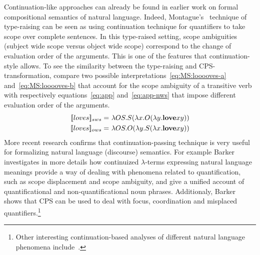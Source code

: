 Continuation-like approaches can already be found in earlier work on formal compositional semantics of natural language. Indeed, Montague's~\cite{Montague:1973:The-Proper-Treatment-of-Quantification-in-Ordinary-English} technique of type-raising can be seen as using continuation technique for quantifiers to take scope over complete sentences. In this type-raised setting, scope ambiguities (subject wide scope versus object wide scope) correspond to the change of evaluation order of the arguments. This is one of the features that continuation-style allows. To see the similarity between the type-raising and CPS-transformation, compare two possible interpretations~\eqref{eq:MS:looooves-a} and~\eqref{eq:MS:looooves-b} that account for the scope ambiguity of a transitive verb with respectively equations~\eqref{eq:app} and~\eqref{eq:app-nws} that impose different evaluation order of the arguments.
%
\begin{subequations}
\begin{align}
\I{loves}_{sws} = \ & \lambda OS. S (\lambda x. O (\lambda y. \textbf{love} x y) ) \label{eq:MS:looooves-a} \\
\I{loves}_{ows} = \ & \lambda OS. O (\lambda y. S (\lambda x. \textbf{love} x y) ) \label{eq:MS:looooves-b}
\end{align}
\label{eq:MS:looooves}
\end{subequations}
%
More recent research confirms that continuation-passing technique is very useful for formalizing natural language (discourse) semantics. For example Barker~\cite{Barker:2002:Continuations-and-the-Nature-of-Quantification} investigates in more details how continuized $\lambda$-terms expressing natural language meanings provide a way of dealing with phenomena related to quantification, such as scope displacement and scope ambiguity, and give a unified account of quantificational and non-quantificational noun phrases. Additionaly, Barker~\cite{Barker:2004:Continuations-in-Natural-Language} shows that CPS can be used to deal with focus, coordination and misplaced quantifiers.\footnote{Other interesting continuation-based analyses of different natural language phenomena include~\cite{Shan:2002:A-continuation-semantics-of-interrogatives-that-accounts-for-Bakers-ambiguity,Shan:2004:Delimited-continuations-in-natural-language,BarkerShan:2008:Donkey-Anaphora-is-In-Scope-Binding}.}

